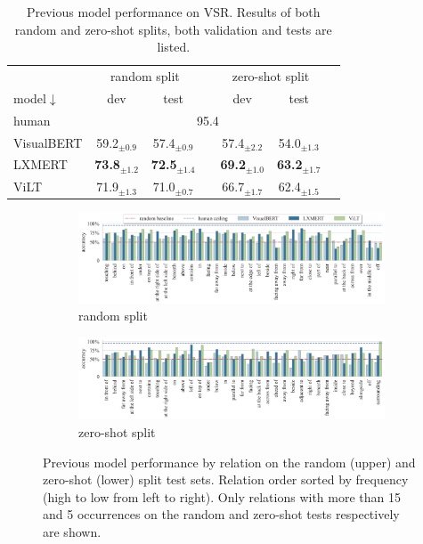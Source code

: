 \begin{table}[ht]
\centering
\small
\begin{tabular}{lcccccc}
\toprule
& \multicolumn{2}{c}{random split} &  & \multicolumn{2}{c}{zero-shot split} \\
\cmidrule(l){2-3} 	\cmidrule(l){4-6}
model$\downarrow$ & dev & test & & dev & test  \\
\midrule
human & \multicolumn{5}{c}{95.4}   \\
\midrule
VisualBERT & 59.2$_{\pm0.9}$ & 57.4$_{\pm0.9}$ & & 57.4$_{\pm2.2}$  & 54.0$_{\pm1.3}$  \\ 
LXMERT & \textbf{73.8}$_{\pm1.2}$  & \textbf{72.5}$_{\pm1.4}$ & & \textbf{69.2}$_{\pm1.0}$  & \textbf{63.2}$_{\pm1.7}$  \\ 
ViLT & 71.9$_{\pm1.3}$  & 71.0$_{\pm0.7}$  & & 66.7$_{\pm1.7}$  & 62.4$_{\pm1.5}$ \\ 
\bottomrule
\end{tabular}
\caption{Previous model performance on VSR. Results of both random and zero-shot splits, both validation and tests are listed.}
\label{tab:vsr_results_previous}
\end{table}

\begin{figure}[ht]
    \centering
\begin{subfigure}[b]{\linewidth}
    \centering
    \includegraphics[width=\linewidth]{images/visual-spatial-reasoning/performance_by_relation_random_split_v2.png}
    \vspace{-1cm}
    \caption{random split}
\end{subfigure}
\begin{subfigure}[b]{\linewidth}
    \centering
    \includegraphics[width=\linewidth]{images/visual-spatial-reasoning/performance_by_relation_zeroshot_split_v2.png}
    \vspace{-1cm}
    \caption{zero-shot split}
\end{subfigure}
\caption{Previous model performance by relation on the random (upper) and zero-shot (lower) split test sets. Relation order sorted by frequency (high to low from left to right). Only relations with more than 15 and 5 occurrences on the random and zero-shot tests respectively are shown. }
    \label{fig:performance_by_rel_base}
\end{figure}


